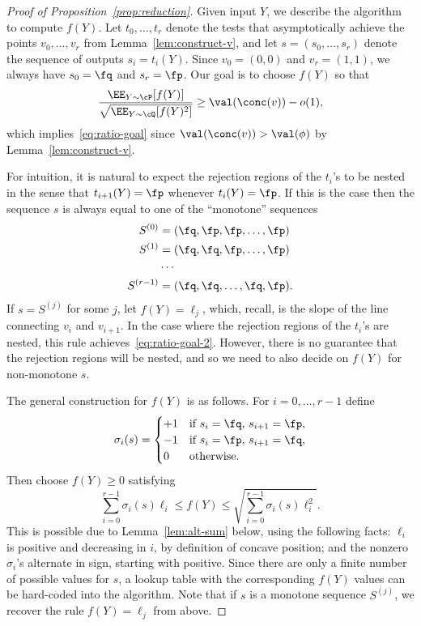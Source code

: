 \documentclass[11pt]{article}
\begin{document}
\begin{proof}[Proof of Proposition~\ref{prop:reduction}]
Given input $Y$, we describe the algorithm to compute $f(Y)$. Let $t_0,\ldots,t_r$ denote the tests that asymptotically achieve the points $v_0,\ldots,v_r$ from Lemma~\ref{lem:construct-v}, and let $s = (s_0,\ldots,s_r)$ denote the sequence of outputs $s_i = t_i(Y)$. Since $v_0 = (0,0)$ and $v_r = (1,1)$, we always have $s_0 = \fq$ and $s_r = \fp$. Our goal is to choose $f(Y)$ so that
\begin{equation}\label{eq:ratio-goal-2}
\frac{\EE_{Y \sim \cP}[f(Y)]}{\sqrt{\EE_{Y \sim \cQ}[f(Y)^2]}} \ge \val(\conc(v)) - o(1),
\end{equation}
which implies~\eqref{eq:ratio-goal} since $\val(\conc(v)) > \val(\phi)$ by Lemma~\ref{lem:construct-v}.

For intuition, it is natural to expect the rejection regions of the $t_i$'s to be nested in the sense that $t_{i+1}(Y) = \fp$ whenever $t_i(Y) = \fp$. If this is the case then the sequence $s$ is always equal to one of the ``monotone'' sequences
\begin{align*}
S^{(0)} &= (\fq,\fp,\fp,\ldots,\fp) \\
S^{(1)} &= (\fq,\fq,\fp,\ldots,\fp) \\
&\cdots \\
S^{(r-1)} &= (\fq,\fq,\ldots,\fq,\fp).
\end{align*}
If $s = S^{(j)}$ for some $j$, let $f(Y) = \ell_j$, which, recall, is the slope of the line connecting $v_i$ and $v_{i+1}$. In the case where the rejection regions of the $t_i$'s are nested, this rule achieves~\eqref{eq:ratio-goal-2}. However, there is no guarantee that the rejection regions will be nested, and so we need to also decide on $f(Y)$ for non-monotone $s$.

The general construction for $f(Y)$ is as follows. For $i = 0,\ldots,r-1$ define
\[ \sigma_i(s) = \begin{cases} +1 & \text{if } s_i = \fq,\, s_{i+1} = \fp, \\ -1 & \text{if } s_i = \fp,\, s_{i+1} = \fq, \\ 0 & \text{otherwise.} \end{cases} \]
Then choose $f(Y) \ge 0$ satisfying
\[ \sum_{i=0}^{r-1} \sigma_i(s) \ell_i \le f(Y) \le \sqrt{\sum_{i=0}^{r-1} \sigma_i(s) \ell_i^2}. \]
This is possible due to Lemma~\ref{lem:alt-sum} below, using the following facts: $\ell_i$ is positive and decreasing in $i$, by definition of concave position; and the nonzero $\sigma_i$'s alternate in sign, starting with positive. Since there are only a finite number of possible values for $s$, a lookup table with the corresponding $f(Y)$ values can be hard-coded into the algorithm. Note that if $s$ is a monotone sequence $S^{(j)}$, we recover the rule $f(Y) = \ell_j$ from above.


\end{proof}
\end{document}
